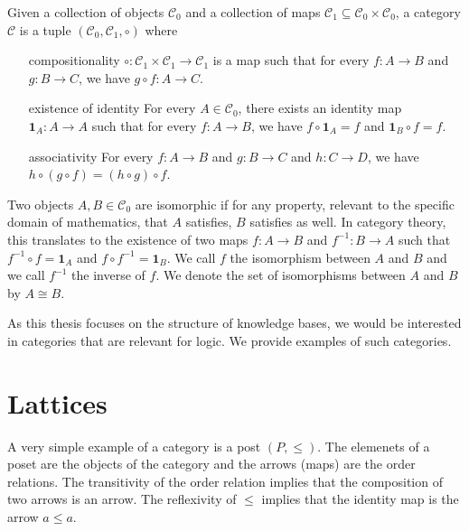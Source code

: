 \begin{definition}[Category]
    Given a collection of objects $\mathcal{C}_0$ and a collection of maps $\mathcal{C}_1\subseteq \mathcal{C}_0\times\mathcal{C}_0$,
    a category $\mathcal{C}$ is a tuple $(\mathcal{C}_0,\mathcal{C}_1,\circ)$ where
    \begin{itemize}
        \item[compositionality] $\circ:\mathcal{C}_1\times\mathcal{C}_1\to\mathcal{C}_1$ is a
        map such that for every $f:A\to B$ and $g:B\to C$, we have $g\circ f:A\to C$.
        \item[existence of identity] For every $A\in\mathcal{C}_0$, there exists an identity map $\mathbf{1}_A:A\to A$
        such that for every $f:A\to B$, we have $f\circ \mathbf{1}_A=f$ and $\mathbf{1}_B\circ f=f$.
        \item[associativity] For every $f:A\to B$ and $g:B\to C$ and $h:C\to D$, we have $h\circ (g\circ f)=(h\circ g)\circ f$.
    \end{itemize}
\end{definition}

Two objects $A,B\in\mathcal{C}_0$ are isomorphic if
for any property, relevant to the specific domain of mathematics,
that $A$ satisfies, $B$ satisfies as well.
In category theory, this translates
to the existence of two maps $f:A\to B$ and $f^{-1}:B\to A$
such that $f^{-1}\circ f=\mathbf{1}_A$ and $f\circ f^{-1}=\mathbf{1}_B$.
We call $f$ the isomorphism between $A$ and $B$ and
we call $f^{-1}$ the inverse of $f$.
We denote the set of isomorphisms between $A$ and $B$ by
$A\cong B$.

As this thesis focuses on the structure of knowledge bases,
we would be interested in categories that are relevant for logic. We provide examples of such categories.

\section{Lattices}
A very simple example of a category is a post $(P,\leq)$. 
The elemenets of a poset are the objects of the category and the arrows (maps) are the order relations.
The transitivity of the order relation implies that the composition of two arrows is an arrow.
The reflexivity of $\leq$ implies that the identity map is the arrow $a\leq a$.